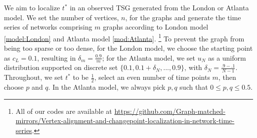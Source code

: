 \documentclass[12pt]{article}
\theoremstyle{definition}
\newcommand{\R}{\mathbb{R}}
\newcommand{\bA}{\mathbf{A}}
\newcommand{\bX}{\mathbf{X}}
\begin{document}
We aim to localize $t^*$ in an observed TSG generated from the London or Atlanta model.
We set the number of vertices, $n$, for the graphs and generate the time series of networks comprising $m$ graphs according to London model \ref{model:London} and Atlanta model \ref{mod:Atlanta}. \footnote{All of our codes are available at \url{https://github.com/Graph-matched-mirrors/Vertex-alignment-and-changepoint-localization-in-network-time-series}.} To prevent the graph from being too sparse or too dense, for the London model, we choose the starting point as $c_L=0.1$, resulting in $\delta_m=\frac{0.9}{m}$; for the Atlanta model, we set $u_N$ as a uniform distribution supported on discrete set $\{0.1, 0.1+\delta_N,...,0.9\}$, with $\delta_N = \frac{.9-.1}{N-1}$.
Throughout, we set $t^*$ to be $\frac{1}{2}$, select an even number of time points $m$, then choose $p$ and $q$.
In the Atlanta model, we always pick $p,q$ such that $0 \le p ,q \le 0.5$. 


\end{document}
